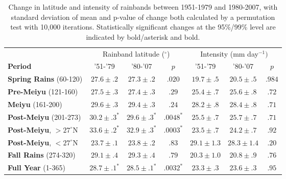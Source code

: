 \documentclass[draft,grl]{agutexSI}
\begin{document}
\begin{table}

\centering

\caption{Change in latitude and intensity of rainbands between 1951-1979 and 1980-2007, with standard deviation of mean and p-value of change both calculated by a permutation test with 10,000 iterations. Statistically significant changes at the 95\%/99\% level are indicated by bold/asterisk and bold.}

\begin{tabular}{ l c c c c c c}
	& \multicolumn{3}{c}{Rainband latitude ($^\circ$)} & \multicolumn{3}{c}{Intensity (mm day$^{-1})$} \\
	\textbf{Period} & '51-'79 & '80-'07 & $p$ & '51-'79 & '80-'07 & $p$ \\
	\hline	
	\textbf{Spring Rains} (60-120)		& $\boldsymbol{27.6 \pm .2}$ & $\boldsymbol{27.3 \pm .2}$ & $ \boldsymbol{.020} $ 		& $\boldsymbol{19.7 \pm .5}$ 	& $\boldsymbol{20.5 \pm .5} $ & $\boldsymbol{.984}$ \\
	\textbf{Pre-Meiyu} (121-160) 		& $27.5 \pm .3$ & $27.4 \pm .3$ & $ .29 $ 		& $25.4 \pm .7$ 	& $25.6 \pm .8	$ & $.72$ \\
	\textbf{Meiyu} (161-200)			& $29.6 \pm .3$ & $29.4 \pm .3$ & $ .24 $ 		& $28.2 \pm .8$ 	& $28.4 \pm .8	$  & $.71$ \\
	\textbf{Post-Meiyu} (201-273)		& $\boldsymbol{30.2 \pm .3^*}$ & $\boldsymbol{29.6 \pm .3^*}$ & $\boldsymbol{.0048^*} $	& $25.5 \pm .7$ 	& $25.7 \pm .7	$ & $.71$ \\
	\textbf{Post-Meiyu}, $>27^\circ$N 	& $\boldsymbol{33.6 \pm .2^*}$ & $\boldsymbol{32.9 \pm .3^*}$ & $\boldsymbol{.0003^*} $ 	& $23.5 \pm .7$ 	& $24.2 \pm .7	$ & $.92$ \\
	\textbf{Post-Meiyu}, $<27^\circ$N 	& $23.7 \pm .1 $ & $23.8 \pm .2$ & $ .83 $ 	& $29.1 \pm 1.3$ 	& $28.3 \pm 1.4	$ & $.20$  \\
	\textbf{Fall Rains} (274-320)			& $29.1 \pm .4 $ & $29.3 \pm .4$ & $ .79 $ 	& $20.3 \pm 1.0$ 	& $20.8 \pm .9	$ & $.76$ \\
	\textbf{Full Year} (1-365)			& $\boldsymbol{28.7 \pm .1^*}$ & $\boldsymbol{28.5 \pm .1^*}$ & $\boldsymbol{.0032^*}$ 	& $23.3 \pm .3$ 	& $23.6 \pm .3	$ & $.95$ \\

\end{tabular}
\label{ts6}
\end{table}
\end{document}
